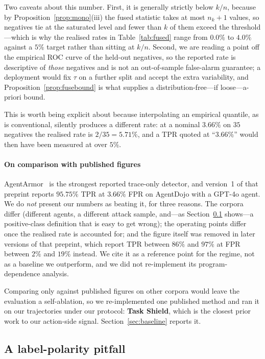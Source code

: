 \documentclass[preprint,12pt,authoryear]{elsarticle}
\theoremstyle{definition}
\begin{document}
Two caveats about this number. First, it is generally strictly below $k/n$, because
by Proposition~\ref{prop:mono}(iii) the fused statistic takes at most $n_k+1$
values, so negatives tie at the saturated level and fewer than $k$ of them exceed
the threshold---which is why the realised rates in Table~\ref{tab:fused} range from
$0.0\%$ to $4.0\%$ against a $5\%$ target rather than sitting at $k/n$. Second, we
are reading a point off the empirical ROC curve of the held-out negatives, so the
reported rate is descriptive of \emph{those} negatives and is not an out-of-sample
false-alarm guarantee; a deployment would fix $\tau$ on a further split and accept
the extra variability, and Proposition~\ref{prop:fusebound} is what supplies a
distribution-free---if loose---a-priori bound.

This is worth being explicit about because interpolating an empirical quantile, as
is conventional, silently produces a different rate: at a nominal $3.66\%$ on $35$
negatives the realised rate is $2/35 = 5.71\%$, and a TPR quoted at ``$3.66\%$''
would then have been measured at over $5\%$.

\paragraph{On comparison with published figures}
AgentArmor~\citep{wang2025agentarmor} is the strongest reported trace-only
detector, and version~1 of that preprint reports $95.75\%$ TPR at $3.66\%$ FPR on
AgentDojo with a GPT-4o agent. We do \emph{not} present our numbers as beating it,
for three reasons. The corpora differ (different agents, a different attack
sample, and---as Section~\ref{sec:polarity} shows---a positive-class definition
that is easy to get wrong); the operating points differ once the realised rate is
accounted for; and the figure itself was removed in later versions of that
preprint, which report TPR between $86\%$ and $97\%$ at FPR between $2\%$ and
$19\%$ instead. We cite it as a reference point for the regime, not as a baseline
we outperform, and we did not re-implement its program-dependence analysis.

Comparing only against published figures on other corpora would leave the
evaluation a self-ablation, so we re-implemented one published method and ran it
on our trajectories under our protocol: \textbf{Task Shield}, which is the closest
prior work to our action-side signal. Section~\ref{sec:baseline} reports it.

\subsection{A label-polarity pitfall}\label{sec:polarity}
\end{document}

